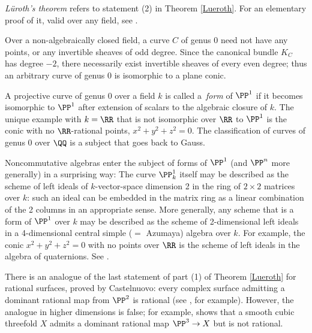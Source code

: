 \begin{fact}
\emph{L\"uroth's theorem} refers to statement (2) in Theorem \ref{Lueroth}.
%
For an elementary proof of it, valid over any
field, see 
\cite[Section 8.13]{JacobsonII}.

Over a non-algebraically closed field, a curve $C$ of genus 0 need not have any points, or any invertible sheaves of odd degree. Since the canonical bundle $K_C$ has degree $-2$, there necessarily exist invertible sheaves of every even degree; thus an arbitrary curve of genus 0 is isomorphic to a  plane conic. 
%

A projective curve of genus 0 over a field $k$ is called a 
\,\emph{form} 
%
of $\PP^1$ if it becomes isomorphic to $\PP^1$ after extension
of scalars to
the algebraic closure of $k$. The unique example with $k = \RR$ that
is not isomorphic over $\RR$ to $\PP^1$
is the conic with no $\RR$-rational points, $x^2+y^2+z^2 = 0$. 
The classification of curves of genus 0 over $\QQ$ is a subject that goes back to Gauss.



Noncommutative algebras enter the subject of forms of $\PP^1$ (and
$\PP^n$ more generally) in a surprising way: The curve $\PP_k^1$
itself may be described as the scheme of 
%
left ideals of $k$-vector-space dimension 2 in the ring of
$2\times 2$ matrices over $k$: such an ideal can be embedded in the
matrix ring as a linear combination of the 2 columns in an appropriate sense. 
More generally, any scheme that is a form of $\PP^1$ over $k$
may be described as the scheme of 2-dimensional left ideals in a 
4-dimensional central simple ($=$ 
Azumaya) algebra
%
over $k$. For example, the
conic $x^2+y^2+z^2 = 0$ with no points over $\RR$ is the scheme of 
left ideals in the algebra of 
quaternions.
%
See \cite[Section X.6]{Serre1979}.

 There is an analogue 
of the last statement of part (1) of Theorem \ref{Lueroth}
for rational surfaces,
proved
by 
%
Castelnuovo: every complex surface admitting a dominant rational
map from $\PP^2$ is rational (see \cite[Corollary V.5]{Beauville}, for
example). 
However, the analogue in higher 
dimensions
is false; for example, \cite{MR0302652} shows that a smooth cubic threefold $X$ admits a dominant rational map $\PP^3 \to X$ but is not rational.

\end{fact}

